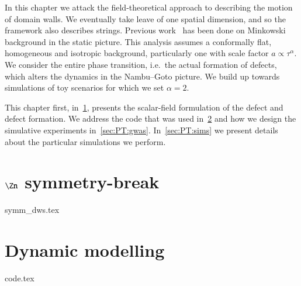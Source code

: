 








In this chapter we attack the field-theoretical approach to describing the motion of domain walls. We eventually take leave of one spatial dimension, and so the framework also describes strings. %
Previous work~\citep{blanco-pilladoDynamicsDomainWall2023} has been done on Minkowski background in the static picture. This analysis assumes a conformally flat, homogeneous and isotropic background, particularly one with scale factor $a\propto \tau^\alpha$. We consider the entire phase transition, i.e.~the actual formation of defects, which alters the dynamics in the Nambu--Goto picture. %
We build up towards simulations of toy scenarios for which we set $\alpha=2$.


This chapter first, in~\cref{sec:PT:symm_dws}, presents the scalar-field formulation of the defect and defect formation. We address the code that was used in~\cref{sec:PT:code} and how we design the simulative experiments in~\cref{sec:PT:gwas}. In~\cref{sec:PT:sims} we present details about the particular simulations we perform.








\section{\(\Zn\) symmetry-break}\label{sec:PT:symm_dws}
    {{symm_dws.tex}}


\section{Dynamic modelling}\label{sec:PT:code} %
    {{code.tex}}

